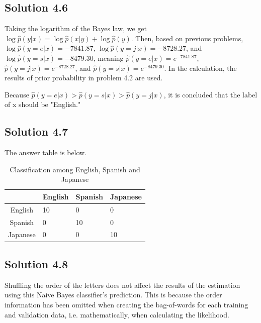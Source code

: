 \documentclass[a4paper]{article}
\theoremstyle{definition}
\newenvironment{soln}{
	\leavevmode\color{blue}\ignorespaces
}{}
\begin{document}
	\subsection*{Solution 4.6}	
	\begin{soln}
	Taking the logarithm of the Bayes law, we get $\log \hat{p}(y|x) = \log \hat{p}(x|y) + \log \hat{p}(y)$. Then, based on previous problems, $\log \hat{p}(y=e|x) = -7841.87$, $\log \hat{p}(y=j|x) = -8728.27$, and $\log \hat{p}(y=s|x) = -8479.30$, meaning $\hat{p}(y=e|x) = e^{-7841.87}$, $\hat{p}(y=j|x) = e^{-8728.27}$, and $\hat{p}(y=s|x) = e^{-8479.30} $. In the calculation, the results of prior probability in problem 4.2 are used.
	
	 Because $\hat{p}(y=e|x) > \hat{p}(y=s|x) > \hat{p}(y=j|x)$, it is concluded that the label of x should be "English." 
	\end{soln}
	
	\subsection*{Solution 4.7}
	\begin{soln}
	The answer table is below.
	\begin{table}[htbp]
  	\centering
	 \caption{Classification among English, Spanish and Japanese}
  	\begin{tabular}{clll}
  	    & English & Spanish & Japanese \\ 
	   \hline
  	  English & 10 & 0 & 0 \\
  	  Spanish & 0 & 10 & 0 \\ 
	  Japanese & 0 & 0 & 10 \\
 	 \end{tabular}
	\end{table}
	
	\end{soln}
	
	\subsection*{Solution 4.8}
	\begin{soln}	
	Shuffling the order of the letters does not affect the results of the estimation using this Naive Bayes classifier’s prediction. This is because the order information has been omitted when creating the bag-of-words for each training and validation data, i.e. mathematically, when calculating the likelihood.
	\end{soln}
	
\end{document}
